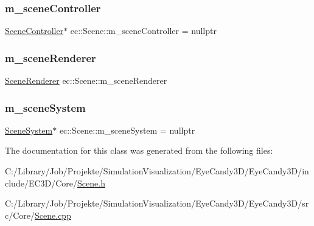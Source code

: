 \subsubsection{\texorpdfstring{m\+\_\+scene\+Controller}{m\_sceneController}}
{\footnotesize\ttfamily \mbox{\hyperlink{classec_1_1_scene_controller}{Scene\+Controller}}$\ast$ ec\+::\+Scene\+::m\+\_\+scene\+Controller = nullptr\hspace{0.3cm}{\ttfamily [protected]}}

\mbox{\label{classec_1_1_scene_a17a2c241cec6bda0a5895b353aa28fa7}} 
\subsubsection{\texorpdfstring{m\+\_\+scene\+Renderer}{m\_sceneRenderer}}
{\footnotesize\ttfamily \mbox{\hyperlink{classec_1_1_scene_renderer}{Scene\+Renderer}} ec\+::\+Scene\+::m\+\_\+scene\+Renderer\hspace{0.3cm}{\ttfamily [protected]}}

\mbox{\label{classec_1_1_scene_ad63e472baf8e283c596891384ea98aad}} 
\subsubsection{\texorpdfstring{m\+\_\+scene\+System}{m\_sceneSystem}}
{\footnotesize\ttfamily \mbox{\hyperlink{classec_1_1_scene_system}{Scene\+System}}$\ast$ ec\+::\+Scene\+::m\+\_\+scene\+System = nullptr\hspace{0.3cm}{\ttfamily [protected]}}



The documentation for this class was generated from the following files\+:\begin{DoxyCompactItemize}
\item 
C\+:/\+Library/\+Job/\+Projekte/\+Simulation\+Visualization/\+Eye\+Candy3\+D/\+Eye\+Candy3\+D/include/\+E\+C3\+D/\+Core/\mbox{\hyperlink{_scene_8h}{Scene.\+h}}\item 
C\+:/\+Library/\+Job/\+Projekte/\+Simulation\+Visualization/\+Eye\+Candy3\+D/\+Eye\+Candy3\+D/src/\+Core/\mbox{\hyperlink{_scene_8cpp}{Scene.\+cpp}}\end{DoxyCompactItemize}
